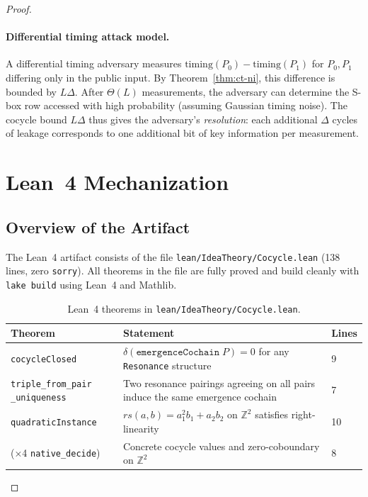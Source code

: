 \documentclass[acmsmall,sigplan,anonymous,review,screen]{acmart}
\theoremstyle{plain}
\theoremstyle{definition}
\newcommand{\rs}{\mathit{rs}}
\newcommand{\lean}[1]{\texttt{#1}}
\begin{document}
\begin{proof}
\paragraph{Differential timing attack model.}
A differential timing adversary measures $\mathrm{timing}(P_0) -
\mathrm{timing}(P_1)$ for $P_0, P_1$ differing only in the public input.
By Theorem~\ref{thm:ct-ni}, this difference is bounded by $L\Delta$.
After $\Theta(L)$ measurements, the adversary can determine the S-box
row accessed with high probability (assuming Gaussian timing noise).
The cocycle bound $L\Delta$ thus gives the adversary's \emph{resolution}:
each additional $\Delta$ cycles of leakage corresponds to one additional
bit of key information per measurement.

\section{Lean~4 Mechanization}
\label{sec:lean}

\subsection{Overview of the Artifact}
\label{sec:lean:overview}

The Lean~4 artifact consists of the file
\lean{lean/IdeaTheory/Cocycle.lean} (138 lines, zero \lean{sorry}).
All theorems in the file are fully proved and build cleanly with
\lean{lake build} using Lean~4 and Mathlib.

\begin{table}[h]
  \caption{Lean~4 theorems in \lean{lean/IdeaTheory/Cocycle.lean}.}
  \label{tab:lean}
  \centering\small
  \begin{tabular}{@{}lp{4.5cm}l@{}}
    \toprule
    Theorem & Statement & Lines \\
    \midrule
    \lean{cocycleClosed}
      & $\delta(\lean{emergenceCochain}\;P) = 0$
        for any \lean{Resonance} structure
      & 9 \\
    \lean{triple\_from\_pair}
    \lean{\_uniqueness}
      & Two resonance pairings agreeing on all
        pairs induce the same emergence cochain
      & 7 \\
    \lean{quadraticInstance}
      & $\rs(a,b) = a_1^2 b_1 + a_2 b_2$ on
        $\mathbb{Z}^2$ satisfies right-linearity
      & 10 \\
    (×4 \lean{native\_decide})
      & Concrete cocycle values and
        zero-coboundary on $\mathbb{Z}^2$
      & 8 \\
    \bottomrule
  \end{tabular}
\end{table}


\end{proof}
\end{document}
